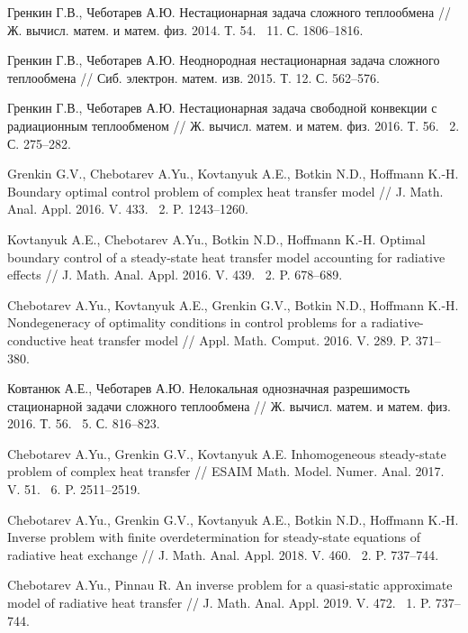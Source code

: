 \documentclass[12pt]{article}
\begin{document}
\begin{thebibliography}{999}
        Гренкин Г.В., Чеботарев А.Ю. Нестационарная задача сложного теплообмена // Ж.
        вычисл. матем. и матем. физ. 2014. Т. 54. \textnumero~11. С. 1806--1816.

        Гренкин Г.В., Чеботарев А.Ю. Неоднородная нестационарная задача сложного теплообмена // Сиб.
        электрон. матем. изв. 2015. Т. 12. С. 562--576.

        Гренкин Г.В., Чеботарев А.Ю. Нестационарная задача свободной конвекции с радиационным теплообменом // Ж.
        вычисл. матем. и матем. физ. 2016. Т. 56. \textnumero~2. С. 275--282.

        Grenkin G.V., Chebotarev A.Yu., Kovtanyuk A.E., Botkin N.D., Hoffmann K.-H. Boundary optimal control problem
        of complex heat transfer model // J. Math.
        Anal. Appl. 2016. V. 433. \textnumero~2. P. 1243--1260.

        Kovtanyuk A.E., Chebotarev A.Yu., Botkin N.D., Hoffmann K.-H. Optimal boundary control of a steady-state heat
        transfer model accounting for radiative effects // J. Math.
        Anal. Appl. 2016. V. 439. \textnumero~2. P. 678--689.

        Chebotarev A.Yu., Kovtanyuk A.E., Grenkin G.V., Botkin N.D., Hoffmann K.-H.
        Nondegeneracy of optimality conditions in control problems for a radiative-conductive heat transfer model
        // Appl.
        Math. Comput. 2016. V. 289. P. 371--380.

        Ковтанюк А.Е., Чеботарев А.Ю. Нелокальная однозначная разрешимость стационарной задачи сложного теплообмена
        // Ж.
        вычисл. матем. и матем. физ. 2016. Т. 56. \textnumero~5. С. 816--823.

        Chebotarev A.Yu., Grenkin G.V., Kovtanyuk A.E. Inhomogeneous steady-state problem of complex heat transfer //
        ESAIM Math.
        Model. Numer. Anal. 2017. V. 51. \textnumero~6. P. 2511--2519.

        Chebotarev A.Yu., Grenkin G.V., Kovtanyuk A.E., Botkin N.D., Hoffmann K.-H. Inverse problem with finite
        overdetermination for steady-state equations of radiative heat exchange // J. Math.
        Anal. Appl. 2018. V. 460. \textnumero~2. P. 737--744.

        Chebotarev A.Yu., Pinnau R. An inverse problem for a quasi-static approximate model of radiative heat transfer
        // J. Math.
        Anal. Appl. 2019. V. 472. \textnumero~1. P. 737--744.



\end{thebibliography}
\end{document}

